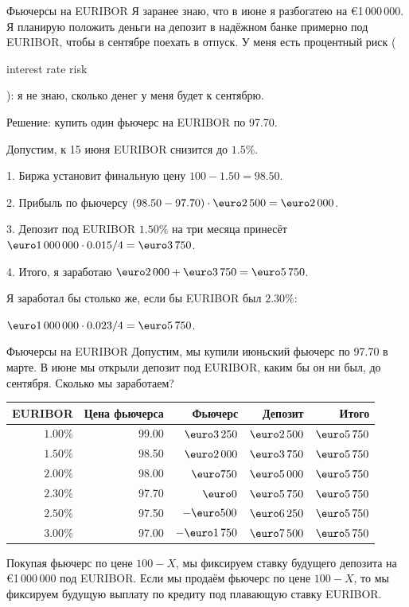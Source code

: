 \documentclass{beamer}
\renewcommand{\EUR}[1]{\textup{\euro}#1}
\newcommand{\en}[1]{\begin{otherlanguage}{english}#1\end{otherlanguage}}
\begin{document}
\begin{frame}{Фьючерсы на EURIBOR}
\justify
Я заранее знаю, что в июне я разбогатею на \EUR{1\,000\,000}. Я планирую положить деньги на депозит в надёжном банке примерно под EURIBOR, чтобы в сентябре поехать в отпуск. У меня есть \alert{процентный риск} (\en{interest rate risk}): я не знаю, сколько денег у меня будет к сентябрю.

\justify
Решение: купить один фьючерс на EURIBOR по 97.70.

\justify
Допустим, к 15 июня EURIBOR снизится до $1.5\%$.

1. Биржа установит финальную цену $100 - 1.50 = 98.50$.

2. Прибыль по фьючерсу $(98.50-97.70)\cdot\EUR{2\,500} = \EUR{2\,000}$.

3. Депозит под EURIBOR $1.50\%$ на три месяца принесёт
$\EUR{1\,000\,000} \cdot 0.015 / 4 = \EUR{3\,750}$.

4. Итого, я заработаю $\EUR{2\,000} + \EUR{3\,750} = \EUR{5\,750}$.

\justify
Я заработал бы столько же, если бы EURIBOR был $2.30\%$:

$\EUR{1\,000\,000} \cdot 0.023/4 =\EUR{5\,750}$.
\end{frame}



\begin{frame}{Фьючерсы на EURIBOR}
\justify
Допустим, мы купили июньский фьючерс по 97.70 в марте. В июне мы открыли депозит под
EURIBOR, каким бы он ни был, до сентября. Сколько мы заработаем?

\justify
\centering
\begin{tabular}{r|r|r|r|r}
EURIBOR   & Цена фьючерса & Фьючерс         & Депозит & Итого \\ \hline
$1.00\%$ & 99.00        & $\EUR{3\,250}$ & $\EUR{2\,500}$  & $\EUR{5\,750}$ \\
$1.50\%$ & 98.50        & $\EUR{2\,000}$ & $\EUR{3\,750}$  & $\EUR{5\,750}$ \\
$2.00\%$ & 98.00        & $\EUR{750}$    & $\EUR{5\,000}$  & $\EUR{5\,750}$ \\
$2.30\%$ & 97.70        & $\EUR{0}$       & $\EUR{5\,750}$  & $\EUR{5\,750}$ \\
$2.50\%$ & 97.50        & $-\EUR{500}$    & $\EUR{6\,250}$ & $\EUR{5\,750}$ \\
$3.00\%$ & 97.00        & $-\EUR{1\,750}$ & $\EUR{7\,500}$ & $\EUR{5\,750}$
\end{tabular}

\justify
Покупая фьючерс по цене $100-X$, мы фиксируем ставку будущего депозита на \EUR{1\,000\,000} под EURIBOR. Если мы продаём фьючерс по цене $100-X$, то мы фиксируем будущую выплату по кредиту под плавающую ставку EURIBOR.
\end{frame}
\end{document}
